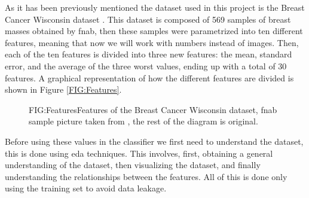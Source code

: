 As it has been previously mentioned the dataset used in this project is the Breast Cancer Wisconsin dataset \cite{william_wolberg_breast_1993}. This dataset is composed of 569 samples of breast masses obtained by \ac{fnab}, then these samples were parametrized into ten different features, meaning that now we will work with numbers instead of images. Then, each of the ten features is divided into three new features: the mean, standard error, and the average of the three worst values, ending up with a total of 30 features. A graphical representation of how the different features are divided is shown in Figure \ref{FIG:Features}.

\begin{figure}[Features]{FIG:Features}{Features of the Breast Cancer Wisconsin dataset, \ac{fnab} sample picture taken from \cite{sidey-gibbons_machine_2019}, the rest of the diagram is original.}
\end{figure}

Before using these values in the classifier we first need to understand the dataset, this is done using \ac{eda} techniques. This involves, first, obtaining a general understanding of the dataset, then visualizing the dataset, and finally understanding the relationships between the features. All of this is done only using the training set to avoid data leakage.

